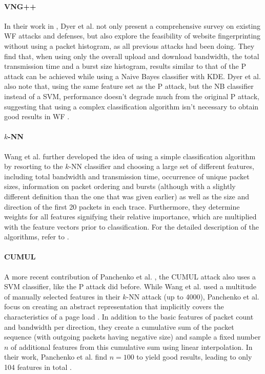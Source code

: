 \documentclass[
	ruledheaders=chapter,
	class=report,
	thesis={type=master, department=inf},
	accentcolor=1c,
	custommargins=true,
	marginpar=false,
	parskip=half-,
	fontsize=11pt,
]{tudapub}
\begin{document}
	\paragraph{VNG++} In their work in \cite{Dyer2012}, Dyer et al. not only present a comprehensive survey on existing WF attacks and defenses, but also explore the feasibility of website fingerprinting without using a packet histogram, as all previous attacks had been doing. They find that, when using only the overall upload and download bandwidth, the total transmission time and a burst size histogram, results similar to that of the P attack can be achieved while using a Naive Bayes classifier with KDE. Dyer et al. also note that, using the same feature set as the P attack, but the NB classifier instead of a SVM, performance doesn't degrade much from the original P attack, suggesting that using a complex classification algorithm isn't necessary to obtain good results in WF \cite{Dyer2012}.
	
	\paragraph{$k$-NN} Wang et al. \cite{Wang2014} further developed the idea of using a simple classification algorithm by resorting to the $k$-NN classifier and choosing a large set of different features, including total bandwidth and transmission time, occurrence of unique packet sizes, information on packet ordering and bursts (although with a slightly different definition than the one that was given earlier) as well as the size and direction of the first 20 packets in each trace. Furthermore, they determine weights for all features signifying their relative importance, which are multiplied with the feature vectors prior to classification. For the detailed description of the algorithms, refer to \cite{Wang2014}.
	
	\paragraph{CUMUL} A more recent contribution of Panchenko et al. \cite{Panchenko2016}, the CUMUL attack also uses a SVM classifier, like the P attack did before. While Wang et al. used a multitude of manually selected features in their $k$-NN attack (up to 4000), Panchenko et al. focus on creating an abstract representation that implicitly covers the characteristics of a page load \cite{Wang2014,Panchenko2016}. In addition to the basic features of packet count and bandwidth per direction, they create a cumulative sum of the packet sequence (with outgoing packets having negative size) and sample a fixed number $n$ of additional features from this cumulative sum using linear interpolation. In their work, Panchenko et al. find $n = 100$ to yield good results, leading to only 104 features in total \cite{Panchenko2016}.
	
\end{document}
